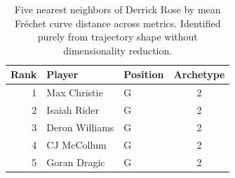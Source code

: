 \begin{table}[htbp]
  \centering\small
  \begin{tabular}{rllc}
    \toprule
    Rank & Player & Position & Archetype \\
    \midrule
    1 & Max Christie & G & 2 \\
    2 & Isaiah Rider & G & 2 \\
    3 & Deron Williams & G & 2 \\
    4 & CJ McCollum & G & 2 \\
    5 & Goran Dragic & G & 2 \\
    \bottomrule
  \end{tabular}
  \caption{Five nearest neighbors of Derrick Rose by mean Fr\'{e}chet curve distance across metrics. Identified purely from trajectory shape without dimensionality reduction.}
  \label{tab:Derrick_Rose_frechet_curve_neighbors}
\end{table}

